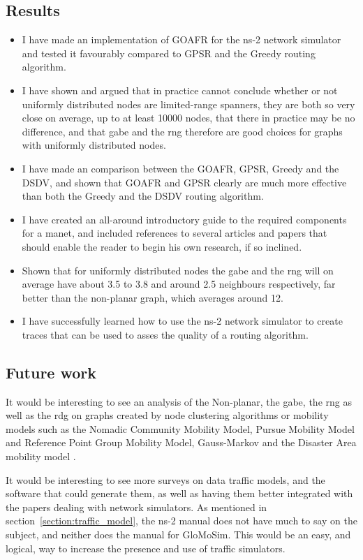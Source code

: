 \subsection{Results}
\begin{itemize}
\item I have made an implementation of GOAFR for the ns-2 network simulator and tested it favourably compared to GPSR and the Greedy routing algorithm.
\item I have shown and argued that in practice cannot conclude whether or not uniformly distributed nodes are limited-range spanners, they are both so very close on average, up to at least 10000 nodes, that there in practice may be no difference, and that \ac{gabe} and the \ac{rng} therefore are good choices for graphs with uniformly distributed nodes.
\item I have made an comparison between the GOAFR, GPSR, Greedy and the DSDV, and shown that GOAFR  and GPSR clearly are much more effective than both the Greedy and the DSDV routing algorithm.
\item I have created an all-around introductory guide to the required components for a \ac{manet}, and included references to several articles and papers that should enable the reader to begin his own research, if so inclined.
\item Shown that for uniformly distributed nodes the \ac{gabe} and the \ac{rng} will on average have about 3.5 to 3.8 and around 2.5 neighbours respectively, far better than the non-planar graph, which averages around 12.
\item I have successfully learned how to use the ns-2 network simulator to create traces that can be used to asses the quality of a routing algorithm.
\end{itemize}

\subsection{Future work}
\label{section:future_work}
It would be interesting to see an analysis of the Non-planar, the \ac{gabe}, the \ac{rng} as well as the \ac{rdg} on graphs created by node clustering algorithms or mobility models such as the  Nomadic Community Mobility Model, Pursue Mobility Model and Reference Point Group Mobility Model, Gauss-Markov \cite{MobilityAdHocResearch} and the Disaster Area mobility model \cite{disasterArea}.

It would be interesting to see more surveys on data traffic models, and the software that could generate them, as well as having them better integrated with the papers dealing with network simulators. As mentioned in section~\ref{section:traffic_model}, the ns-2 manual does not have much to say on the subject, and neither does the manual for GloMoSim. This would be an easy, and logical, way to increase the presence and use of traffic simulators.

